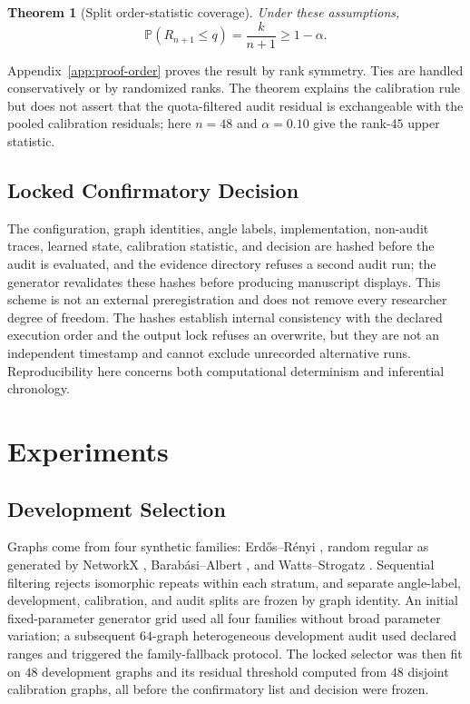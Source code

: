 \documentclass[10pt,twocolumn]{article}
\newtheorem{theorem}{Theorem}[section]
\newcommand{\Pp}{\mathbb{P}}
\begin{document}
\begin{theorem}[Split order-statistic coverage]
\label{thm:order}
Under these assumptions,
\begin{equation}
 \Pp(R_{n+1}\le q)=\frac{k}{n+1}\ge1-\alpha.
 \label{eq:coverage}
\end{equation}
\end{theorem}

Appendix~\ref{app:proof-order} proves the result by rank symmetry.  Ties are
handled conservatively or by randomized ranks.  The theorem explains the
calibration rule but does not assert that the quota-filtered audit residual is
exchangeable with the pooled calibration residuals; here $n=48$ and
$\alpha=0.10$ give the rank-$45$ upper statistic.

\subsection{Locked Confirmatory Decision}

The configuration, graph identities, angle labels, implementation, non-audit
traces, learned state, calibration statistic, and decision are hashed before the
audit is evaluated, and the evidence directory refuses a second audit run; the
generator revalidates these hashes before producing manuscript displays.  This
scheme is not an external preregistration and does not remove every researcher
degree of freedom.  The hashes establish internal consistency with the declared
execution order and the output lock refuses an overwrite, but they are not an
independent timestamp and cannot exclude unrecorded alternative runs.
Reproducibility here concerns both computational determinism and inferential
chronology.

\section{Experiments}

\subsection{Development Selection}

Graphs come from four synthetic families: Erd\H{o}s--R\'enyi
\citep{erdos1959random}, random regular as generated by NetworkX
\citep{hagberg2008networkx}, Barab\'asi--Albert \citep{barabasi1999emergence},
and Watts--Strogatz \citep{watts1998collective}.  Sequential filtering rejects
isomorphic repeats within each stratum, and separate angle-label, development,
calibration, and audit splits are frozen by graph identity.  An initial
fixed-parameter generator grid used all four families without broad parameter
variation; a subsequent $64$-graph heterogeneous development audit used declared
ranges and triggered the family-fallback protocol.  The locked selector was then
fit on $48$ development graphs and its residual threshold computed from $48$
disjoint calibration graphs, all before the confirmatory list and decision were
frozen.
\end{document}
